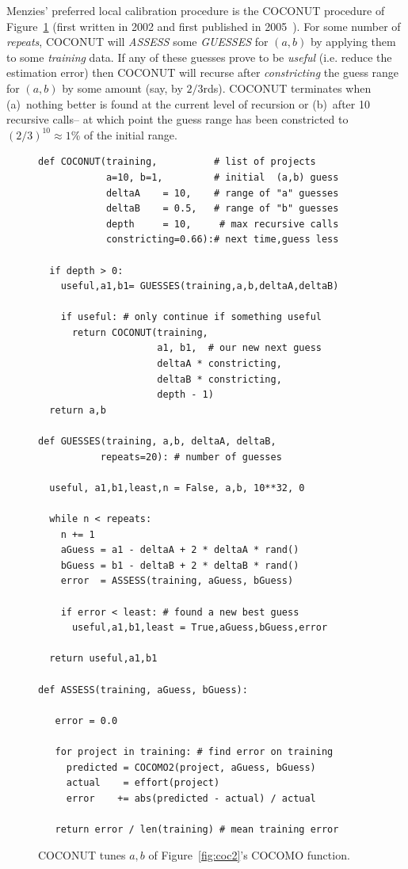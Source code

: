 \documentclass[smallcondesed]{svjour3}
\newcommand{\fig}[1]{Figure~\ref{fig:#1}}
\begin{document}
Menzies' preferred local calibration procedure is the COCONUT
procedure of \fig{coconut} (first written in 2002
and first published in 2005~\cite{me04h}). 
For some number of {\em repeats},
COCONUT will {\em ASSESS} some {\em GUESSES} 
 for $(a,b)$ by applying them to some
{\em training} data. If any of these guesses prove to
be {\em useful} (i.e. reduce the estimation error) then COCONUT will recurse after
{\em constricting} the guess range for $(a,b)$ by some amount (say, by $2/3$rds). COCONUT terminates
when (a)~nothing better is found at the current level of recursion
or (b)~after 10 recursive calls-- at which point the guess range
has been constricted to  $(2/3)^{10}\approx 1$\% of the initial range.

 

\begin{figure}
\begin{lstlisting}
def COCONUT(training,          # list of projects
            a=10, b=1,         # initial  (a,b) guess
            deltaA    = 10,    # range of "a" guesses 
            deltaB    = 0.5,   # range of "b" guesses
            depth     = 10,     # max recursive calls
            constricting=0.66):# next time,guess less
            
  if depth > 0:
    useful,a1,b1= GUESSES(training,a,b,deltaA,deltaB)
    
    if useful: # only continue if something useful
      return COCONUT(training, 
                     a1, b1,  # our new next guess
                     deltaA * constricting,
                     deltaB * constricting,
                     depth - 1)
  return a,b

def GUESSES(training, a,b, deltaA, deltaB,
           repeats=20): # number of guesses
           
  useful, a1,b1,least,n = False, a,b, 10**32, 0
  
  while n < repeats:
    n += 1
    aGuess = a1 - deltaA + 2 * deltaA * rand()
    bGuess = b1 - deltaB + 2 * deltaB * rand()
    error  = ASSESS(training, aGuess, bGuess)
    
    if error < least: # found a new best guess
      useful,a1,b1,least = True,aGuess,bGuess,error
      
  return useful,a1,b1

def ASSESS(training, aGuess, bGuess):

   error = 0.0
   
   for project in training: # find error on training
     predicted = COCOMO2(project, aGuess, bGuess)
     actual    = effort(project)
     error    += abs(predicted - actual) / actual
     
   return error / len(training) # mean training error
\end{lstlisting}
\caption{COCONUT  tunes  $a,b$ 
of \fig{coc2}'s COCOMO function.}\label{fig:coconut}
\end{figure}
\end{document}
